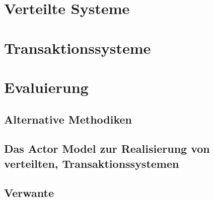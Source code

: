 
\chapter{Verteilte Systeme}
\chapter{Transaktionssysteme}
\chapter{Evaluierung}
\section{Alternative Methodiken}
\section{Das Actor Model zur Realisierung von verteilten, Transaktionssystemen} 
\section{Verwante}